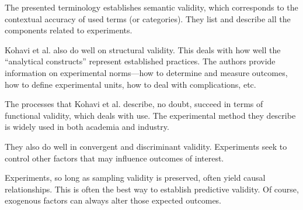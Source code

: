 \documentclass[11pt]{article}
\begin{document}
The presented terminology establishes semantic validity, which corresponds to
the contextual accuracy of used terms (or categories). They list and describe
all the components related to experiments.

Kohavi et al. also do well on structural validity. This deals with how well the
``analytical constructs'' represent established practices. The authors provide
information on experimental norms---how to determine and measure outcomes, how
to define experimental units, how to deal with complications, etc.

The processes that Kohavi et al. describe, no doubt, succeed in terms of
functional validity, which deals with use. The experimental method they
describe is widely used in both academia and industry.

They also do well in convergent and discriminant validity. Experiments seek to
control other factors that may influence outcomes of interest.

Experiments, so long as sampling validity is preserved, often yield causal
relationships. This is often the best way to establish predictive validity. Of
course, exogenous factors can always alter those expected outcomes.
\end{document}
